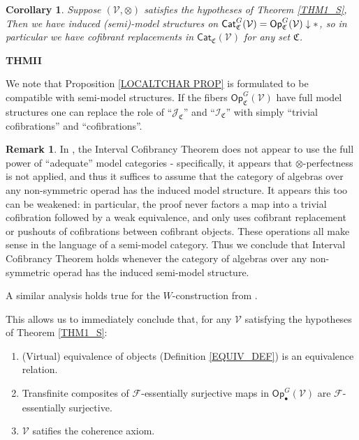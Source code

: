 \documentclass[a4paper,10pt
,draft
]{article}%
\numberwithin{equation}{section}
\numberwithin{figure}{section}
\newtheorem{corollary}[equation]{Corollary}%
\theoremstyle{definition} %
\newtheorem{remark}[equation]{Remark}%
\newcommand{\Sym}{\ensuremath{\mathsf{Sym}}}%
\newcommand{\Top}{\ensuremath{\mathsf{Top}}}
\newcommand{\Cat}{\mathsf{Cat}}
\newcommand{\Op}{\mathsf{Op}}%
\newcommand{\F}{\ensuremath{\mathcal F}}
\newcommand{\V}{\ensuremath{\mathcal V}}
\newcommand{\1}{\ensuremath{\mathbbm 1}}%
\begin{document}
\begin{corollary}
      \label{CATV_MC_COR}
      Suppose $(\V, \otimes)$ satisfies the hypotheses of Theorem \ref{THM1_S},
      Then we have induced (semi)-model structures on $\Cat^{G}_{ \mathfrak C}(\V) = \Op^{G}_{\mathfrak C}(\V) \downarrow \**$,
      so in particular we have cofibrant replacements in $\Cat_{\mathfrak C}(\V)$ for any set $\mathfrak C$.
\end{corollary}



\textbf{THMII}


We note that Proposition \ref{LOCALTCHAR PROP} is formulated to be compatible with semi-model structures.
If the fibers $\mathsf{Op}^G_{\mathfrak{C}}(\V)$ have full model structures one can replace the role of
``$\mathcal{J}_{\mathfrak{C}}$'' and ``$\mathcal{I}_{\mathfrak{C}}$''
with simply ``trivial cofibrations'' and ``cofibrations''.


\begin{remark}
      In \cite{BM13}, the Interval Cofibrancy Theorem does not appear to use the full power of ``adequate'' model categories -
      specifically, it appears that $\otimes$-perfectness is not applied,
      and thus it suffices to assume that the category of algebras over any non-symmetric operad has the induced model structure.
      It appears this too can be weakened:
      in particular, the proof never factors a map into a trivial cofibration followed by a weak equivalence,
      and only uses cofibrant replacement or pushouts of cofibrations between cofibrant objects.
      These operations all make sense in the language of a semi-model category.
      Thus we conclude that Interval Cofibrancy Theorem holds whenever the category of algebras over any non-symmetric operad has the induced semi-model structure. 

      A similar analysis holds true for the $W$-construction from \cite{BM06}.
      
      This allows us to immediately conclude that, for any $\V$ satisfying the hypotheses of Theorem \ref{THM1_S}:
      \begin{enumerate}[label=(\roman*)]
      \item (Virtual) equivalence of objects (Definition \ref{EQUIV_DEF}) is an equivalence relation.
      \item Transfinite composites of $\F$-essentially surjective maps in $\Op^G_\bullet(\V)$ are $\F$-essentially surjective.
      \item $\V$ satifies the coherence axiom.
      \end{enumerate}
\end{remark}
\end{document}

